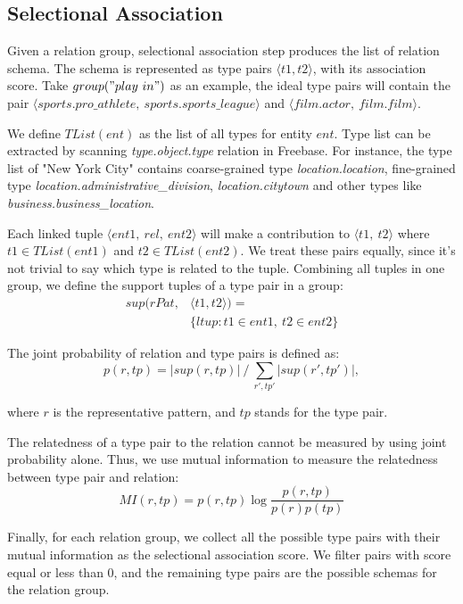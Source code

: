 \subsection{Selectional Association}
Given a relation group, selectional association step produces the list of relation
schema.
The schema is represented as type pairs $\langle t1, t2 \rangle$, with its association score.
Take $group("play\ in")$ as an example, the ideal type pairs will contain the pair
$\langle sports.pro\_athlete,\ sports.sports\_league \rangle$ and
$\langle film.actor,\ film.film \rangle$.

We define $TList(ent)$ as the list of all types for entity $ent$. Type list can be
extracted by scanning \textit{type.object.type} relation in Freebase.
For instance, the type list of "New York City" contains coarse-grained type \textit{location.location}, fine-grained type \textit{location.administrative\_division},
\textit{location.citytown} and other types like \textit{business.business\_location}.

Each linked tuple $\langle ent1,\ rel,\ ent2 \rangle$ will make a contribution to $\langle t1,\ t2 \rangle$
where $t1 \in TList(ent1)$ and $t2 \in TList(ent2)$. We treat these pairs equally, since it's not trivial to
say which type is related to the tuple.
Combining all tuples in one group, we define the support tuples of a type pair in a group:
\begin{equation}
\begin{aligned}
sup(rPat, &\langle t1, t2 \rangle) = \\
&\{ltup : t1 \in ent1,\ t2 \in ent2 \}
\end{aligned}
\end{equation}

\noindent
The joint probability of relation and type pairs is defined as:
\begin{equation}
p(r, tp) = |sup(r, tp)|\ /\ \sum\limits_{r', tp'} |sup(r', tp')|,
\end{equation}

\noindent
where $r$ is the representative pattern, and $tp$ stands for the type pair.

The relatedness of a type pair to the relation cannot be measured
by using joint probability alone. Thus, we use mutual information to
measure the relatedness between type pair and relation:
\begin{equation}
MI(r, tp) = p(r, tp) \log \frac {p(r, tp)}{p(r) p(tp)}
\end{equation}

Finally, for each relation group, we collect all the possible type pairs with
their mutual information as the selectional association score.
We filter pairs with score equal or less than 0, and the remaining type pairs
are the possible schemas for the relation group.
